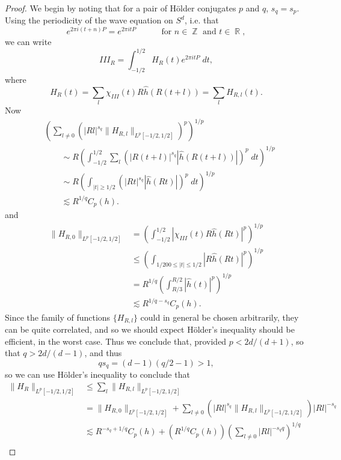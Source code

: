 \documentclass[dvipsnames,letterpaper,12pt]{article}
\DeclareMathOperator{\RR}{\mathbb{R}}
\DeclareMathOperator{\ZZ}{\mathbb{Z}}
\begin{document}
\begin{proof}
    We begin by noting that for a pair of H\"{o}lder conjugates $p$ and $q$, $s_q = s_p$. Using the periodicity of the wave equation on $S^d$, i.e. that
    \[ e^{2 \pi i (t + n) P} = e^{2 \pi i t P} \quad\quad\quad\text{for $n \in \ZZ$ and $t \in \RR$}, \]
    we can write
    \[ III_R = \int_{-1/2}^{1/2} H_R(t) e^{2 \pi i t P}\; dt, \]
    where
    \[ H_R(t) = \sum_l \chi_{III}(t) R \widehat{h}(R(t + l)) = \sum_l H_{R,l}(t). \]
    Now
    \begin{align*}
        &\left( \sum_{l \neq 0} \left( |Rl|^{s_q} \| H_{R,l} \|_{L^p[-1/2,1/2]} \right)^p \right)^{1/p}\\
        &\quad\quad \sim R \left( \int_{-1/2}^{1/2} \sum_l \left( |R(t + l)|^{s_q} |\widehat{h}(R(t + l))| \right)^p\; dt \right)^{1/p}\\
        &\quad\quad\sim R \left( \int_{|t| \geq 1/2} \left( |Rt|^{s_q} |\widehat{h}(Rt)| \right)^p\; dt \right)^{1/p} \\
        &\quad\quad\lesssim R^{1/q} C_p(h).
    \end{align*}
    and
    \begin{align*}
        \| H_{R,0} \|_{L^p[-1/2,1/2]} &= \left( \int_{-1/2}^{1/2} |\chi_{III}(t) R \widehat{h}(Rt)|^p \right)^{1/p}\\
        &\leq \left( \int_{1/200 \leq |t| \leq 1/2} |R \widehat{h}(Rt)|^p \right)^{1/p}\\
        &= R^{1/q} \left( \int_{R/3}^{R/2} |\widehat{h}(t)|^p \right)^{1/p}\\
        &\lesssim R^{1/q - s_q} C_p(h).
    \end{align*}
    Since the family of functions $\{ H_{R,l} \}$ could in general be chosen arbitrarily, they can be quite correlated, and so we should expect H\"{o}lder's inequality should be efficient, in the worst case. Thus we conclude that, provided $p < 2d/(d+1)$, so that $q > 2d/(d-1)$, and thus
    \[ q s_q = (d-1)(q/2 - 1) > 1, \]
    so we can use H\"{o}lder's inequality to conclude that
    \begin{align*}
        \| H_R \|_{L^p[-1/2,1/2]} &\leq \sum_l \| H_{R,l} \|_{L^p[-1/2,1/2]}\\
        &= \| H_{R,0} \|_{L^p[-1/2,1/2]} + \sum_{l \neq 0} \left( |Rl|^{s_q} \| H_{R,l} \|_{L^p[-1/2,1/2]} \right) |Rl|^{-s_q} \\
        &\lesssim R^{-s_q + 1/q} C_p(h) + ( R^{1/q} C_p(h) ) \left( \sum_{l \neq 0} |Rl|^{- s_q q} \right)^{1/q}\\

\end{align*}
\end{proof}
\end{document}
